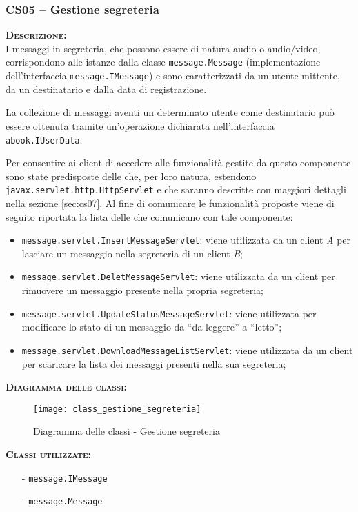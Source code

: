 \subsubsection{CS05 -- Gestione segreteria}\label{sec:cs05}
\begin{description}
	\item{\scshape\bfseries Descrizione:}\\
I messaggi in segreteria, che possono essere di natura audio o audio/video, corrispondono alle istanze dalla classe \texttt{message.Message} (implementazione dell'interfaccia \texttt{message.IMessage}) e sono caratterizzati da un utente mittente, da un destinatario e dalla data di registrazione.

La collezione di messaggi aventi un determinato utente come destinatario può essere ottenuta tramite un'operazione dichiarata nell'interfaccia \texttt{abook.IUserData}.

Per consentire ai client di accedere alle funzionalità gestite da questo componente sono state predisposte delle  che, per loro natura, estendono \texttt{javax.servlet.http.HttpServlet} e che saranno descritte con maggiori dettagli nella sezione \vref{sec:cs07}. Al fine di comunicare le funzionalità proposte viene di seguito riportata la lista delle  che comunicano con tale componente:

\begin{itemize}
	\item \texttt{message.servlet.InsertMessageServlet}: viene utilizzata da un client \textit{A} per lasciare un messaggio nella segreteria di un client \textit{B};
	\item \texttt{message.servlet.DeletMessageServlet}: viene utilizzata da un client per rimuovere un messaggio presente nella propria segreteria;
	\item \texttt{message.servlet.UpdateStatusMessageServlet}: viene utilizzata per modificare lo stato di un messaggio da ``da leggere'' a ``letto'';
	\item \texttt{message.servlet.DownloadMessageListServlet}: viene utilizzata da un client per scaricare la lista dei messaggi presenti nella sua segreteria;
\end{itemize}

	\item{\scshape\bfseries Diagramma delle classi:}
\begin{figure}[H]
  \centering
  \texttt{[image: class\_gestione\_segreteria]}
  \caption{Diagramma delle classi - Gestione segreteria}\label{fig:gestionesegreteria}
\end{figure}	
	
	\item{\scshape\bfseries Classi utilizzate:}
	\begin{itemize}[noitemsep,nolistsep]
		\item[-] \texttt{message.IMessage}
	  	\item[-] \texttt{message.Message}
	\end{itemize}
\end{description}

